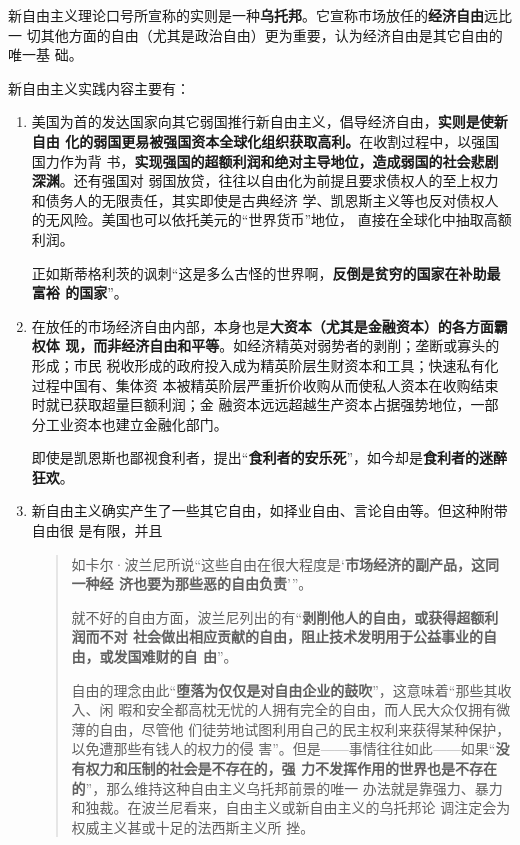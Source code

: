 新自由主义理论口号所宣称的实则是一种\textbf{乌托邦}。它宣称市场放任的\textbf{经济自由}远比一
切其他方面的自由（尤其是政治自由）更为重要，认为经济自由是其它自由的唯一基
础。

新自由主义实践内容主要有：
\begin{enumerate}
\item 美国为首的发达国家向其它弱国推行新自由主义，倡导经济自由，\textbf{实则是使新自由
    化的弱国更易被强国资本全球化组织获取高利。}在收割过程中，以强国国力作为背
  书，\textbf{实现强国的超额利润和绝对主导地位，造成弱国的社会悲剧深渊}。还有强国对
  弱国放贷，往往以自由化为前提且要求债权人的至上权力和债务人的无限责任，其实即使是古典经济
  学、凯恩斯主义等也反对债权人的无风险。美国也可以依托美元的“世界货币”地位，
  直接在全球化中抽取高额利润。

  正如斯蒂格利茨的讽刺“这是多么古怪的世界啊，\textbf{反倒是贫穷的国家在补助最富裕
    的国家}”。


\item 在放任的市场经济自由内部，本身也是\textbf{大资本（尤其是金融资本）的各方面霸权体
    现，而非经济自由和平等}。如经济精英对弱势者的剥削；垄断或寡头的形成；市民
  税收形成的政府投入成为精英阶层生财资本和工具；快速私有化过程中国有、集体资
  本被精英阶层严重折价收购从而使私人资本在收购结束时就已获取超量巨额利润；金
  融资本远远超越生产资本占据强势地位，一部分工业资本也建立金融化部门。

  即使是凯恩斯也鄙视食利者，提出“\textbf{食利者的安乐死}”，如今却是\textbf{食利者的迷醉
    狂欢}。

\item 新自由主义确实产生了一些其它自由，如择业自由、言论自由等。但这种附带自由很
  是有限，并且
  \begin{quotation}
    如卡尔·波兰尼所说“这些自由在很大程度是‘\textbf{市场经济的副产品，这同一种经
      济也要为那些恶的自由负责}’”。

    就不好的自由方面，波兰尼列出的有“\textbf{剥削他人的自由，或获得超额利润而不对
      社会做出相应贡献的自由，阻止技术发明用于公益事业的自由，或发国难财的自
      由}”。

    自由的理念由此“\textbf{堕落为仅仅是对自由企业的鼓吹}”，这意味着“那些其收入、闲
    暇和安全都高枕无忧的人拥有完全的自由，而人民大众仅拥有微薄的自由，尽管他
    们徒劳地试图利用自己的民主权利来获得某种保护，以免遭那些有钱人的权力的侵
    害”。但是——事情往往如此——如果“\textbf{没有权力和压制的社会是不存在的，强
      力不发挥作用的世界也是不存在的}”，那么维持这种自由主义乌托邦前景的唯一
    办法就是靠强力、暴力和独裁。在波兰尼看来，自由主义或新自由主义的乌托邦论
    调注定会为权威主义甚或十足的法西斯主义所
    挫。 
  \end{quotation}


\end{enumerate}
